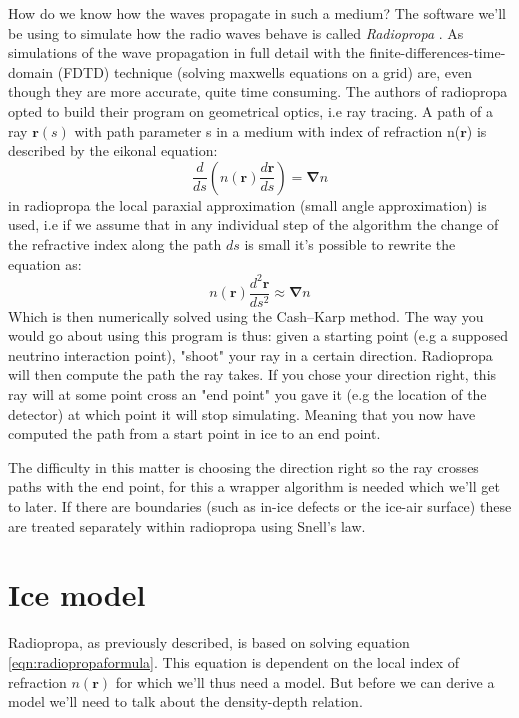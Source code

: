 How do we know how the waves propagate in such a medium?  The software we'll be
using to simulate how the radio waves behave is called \textit{Radiopropa}
\cite{Winchen_2019}. As simulations of the wave propagation in full detail with
the finite-differences-time-domain (FDTD) technique \cite{1138693} (solving
maxwells equations on a grid) are, even though they are more accurate, quite time
consuming. The authors of radiopropa opted to build their program on
geometrical optics, i.e ray tracing. A path of a ray $\mathbf{r}(s)$ with path
parameter s in a medium with index of refraction n($\mathbf{r}$) is described
by the eikonal equation\cite{herman2019treatise}:
\begin{equation}
	\frac{d}{ds}\left(n(\mathbf{r})\frac{d\mathbf{r}}{ds}\right) = \mathbf{\nabla} n
\end{equation}
in radiopropa the local paraxial approximation (small angle approximation) is
used, i.e if we assume that in any individual step of the algorithm the change
of the refractive index along the path $ds$ is small it's possible to rewrite
the equation as:
\begin{equation}
	n(\mathbf{r})\frac{d^2\mathbf{r}}{ds^2} \approx \mathbf{\nabla} n
	\label{eqn:radiopropaformula}
\end{equation}
Which is then numerically solved using the Cash–Karp method.  The way you would
go about using this program is thus: given a starting point (e.g a supposed
neutrino interaction point), "shoot" your ray in a
certain direction. Radiopropa will then compute the path the ray takes. 
If you chose your direction right, this ray will at some point cross an
"end point" you gave it (e.g the location of the detector) at which point it will
stop simulating. Meaning that you now have computed the path from a start point in ice
to an end point.

The difficulty in this matter is choosing the direction right so the ray
crosses paths with the end point, for this a wrapper algorithm is needed which we'll
get to later.  If there are boundaries (such as in-ice defects or the ice-air surface) these
are treated separately within radiopropa using Snell's law. 
\section{Ice model}
\label{section:Ice Model}
Radiopropa, as previously described, is based on solving equation \ref{eqn:radiopropaformula}.
This equation is dependent on the local index of refraction $n(\mathbf{r})$ for which
we'll thus need a model. But before we can derive a model we'll need to talk about the
density-depth relation.

